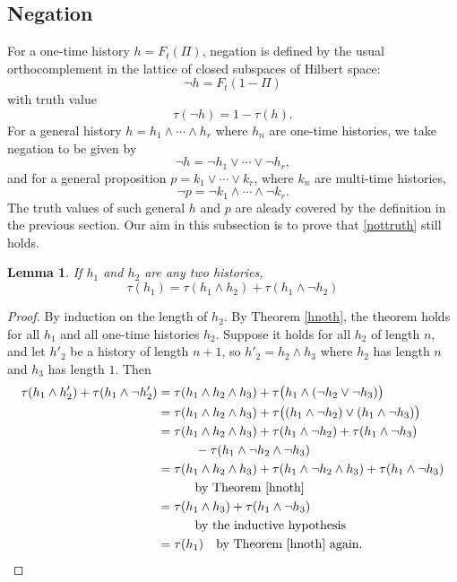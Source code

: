 \documentclass[12pt,a4paper,reqno]{article}
\renewcommand{\(}{\left(}
\renewcommand{\)}{\right)}
\newcommand{\<}{\langle}
\renewcommand{\>}{\rangle}
\newcommand{\qqquad}{\quad\quad\quad}
\newcommand{\be}{\begin{equation}}
\newcommand{\ee}{\end{equation}}
\theoremstyle{plain} %
\newtheorem{lemma}{Lemma}
\begin{document}
\subsection{Negation}
\label{subsec:negation}

For a one-time history $h = F_t(\Pi)$, negation is defined by the usual orthocomplement in the lattice of closed subspaces of Hilbert space:
\[
\lnot h = F_t(1 - \Pi)
\]
with truth value
\be\label{nottruth}
\tau(\lnot h) = 1 - \tau(h).
\ee
For a general history $h = h_1\land\cdots\land h_r$ where $h_n$ are one-time histories, we take negation to be given by
\[
\lnot h = \lnot h_1\lor\cdots\lor\lnot h_r,
\]
and for a general proposition $p = k_1\lor\cdots\lor k_r$, where $k_n$ are multi-time histories,
\[
\lnot p = \lnot k_1\land\cdots\land\lnot k_r.
\]
The truth values of such general $h$ and $p$ are aleady covered by the definition in the previous section. Our aim in this subsection is to prove that \eqref{nottruth} still holds.

\begin{lemma}\label{hnothagain} If $h_1$ and $h_2$ are any two histories,
\[
\tau(h_1) = \tau(h_1\land h_2) + \tau(h_1\land\lnot h_2)
\]
\end{lemma}
\begin{proof}
By induction on the length of $h_2$. By Theorem \ref{hnoth}, the theorem holds for all $h_1$ and all one-time histories $h_2$. Suppose it holds for all $h_2$ of length $n$, and let $h'_2$ be a history of length $n+1$, so $h'_2 = h_2 \land h_3$ where $h_2$ has length $n$ and $h_3$ has length $1$. Then
\begin{align*}
\tau(h_1 \land h'_2) + \tau(h_1 \land \lnot h'_2)
&= \tau(h_1 \land h_2 \land h_3)  + \tau\big(h_1 \land (\lnot h_2 \lor\lnot h_3)\big)\\
&= \tau(h_1 \land h_2 \land h_3)  +\tau\big((h_1\land\lnot h_2)\lor(h_1\land\lnot h_3)\big)\\
&= \tau(h_1 \land h_2 \land h_3)  +\tau(h_1\land \lnot h_2) + \tau(h_1\land\lnot h_3)\\ 
&\qqquad -\tau(h_1\land\lnot h_2\land\lnot h_3)\\
&= \tau(h_1 \land h_2 \land h_3)  + \tau(h_1\land\lnot h_2\land h_3) + \tau(h_1\land \lnot h_3)\\ &\qqquad\text{by Theorem \ref{hnoth}}\\
&= \tau(h_1\land h_3) + \tau(h_1\land\lnot h_3)\\
&\qqquad \text{by the inductive hypothesis}\\
&= \tau (h_1) \quad\text{by Theorem \ref{hnoth} again}.
\end{align*}
\end{proof}
\end{document}
